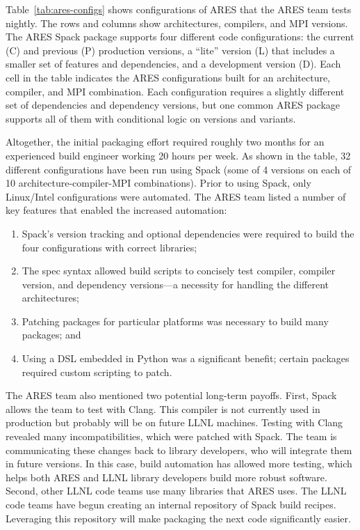 Table~\ref{tab:ares-configs} shows configurations of ARES that the ARES
team tests nightly.  The rows and columns show architectures, compilers, and MPI versions.
The ARES Spack package supports four different code configurations:
the current (C) and previous (P) production versions, a ``lite'' version (L) that includes
a smaller set of features and dependencies, and a development version (D).
Each cell in the table indicates the ARES configurations built for an architecture,
compiler, and MPI combination. Each configuration requires a slightly different
set of dependencies and dependency versions, but one common ARES package supports
all of them with conditional logic on versions and variants.

Altogether, the initial packaging effort required roughly two months 
for an experienced build engineer working 20 hours per week.
As shown in the table, 32 different configurations have been run using Spack
(some of 4 versions on each of 10 architecture-compiler-MPI combinations).
Prior to using Spack, only Linux/Intel configurations were automated. The ARES 
team listed a number of key features that enabled the increased automation:
\begin{enumerate}
\item Spack's version tracking and optional dependencies were required to
      build the four configurations with correct libraries;
\item The spec syntax allowed build scripts to concisely test compiler,
      compiler version, and dependency versions---a necessity
      for handling the different architectures;
\item Patching packages for particular platforms was
      necessary to build many packages; and
\item Using a DSL embedded in Python was a significant benefit;
      certain packages required custom scripting to patch.
\end{enumerate}

The ARES team also mentioned two potential long-term payoffs. First, Spack 
allows the team to test with Clang.  This compiler is not currently used in
production but probably will be on future LLNL machines. Testing with Clang 
revealed many incompatibilities, which were patched with Spack. The team is 
communicating these changes back to library developers, who will integrate 
them in future versions. In this case, build automation has allowed more 
testing, which helps both ARES and LLNL library developers build more robust 
software. Second, other LLNL code teams use many libraries that ARES uses.
The LLNL code teams have begun creating an internal repository of Spack 
build recipes.  Leveraging this repository will make packaging the next 
code significantly easier.
